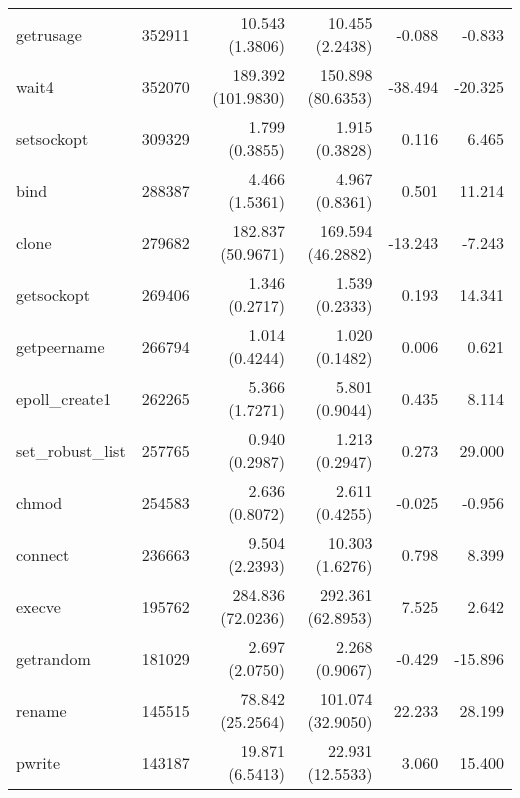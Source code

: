 \begin{longtable}{>{\ttfamily}lrrrrr}
                      getrusage &      352911 &          10.543 (1.3806) &          10.455 (2.2438) &          -0.088 &       -0.833 \\
                          wait4 &      352070 &       189.392 (101.9830) &        150.898 (80.6353) &         -38.494 &      -20.325 \\
                     setsockopt &      309329 &           1.799 (0.3855) &           1.915 (0.3828) &           0.116 &        6.465 \\
                           bind &      288387 &           4.466 (1.5361) &           4.967 (0.8361) &           0.501 &       11.214 \\
                          clone &      279682 &        182.837 (50.9671) &        169.594 (46.2882) &         -13.243 &       -7.243 \\
                     getsockopt &      269406 &           1.346 (0.2717) &           1.539 (0.2333) &           0.193 &       14.341 \\
                    getpeername &      266794 &           1.014 (0.4244) &           1.020 (0.1482) &           0.006 &        0.621 \\
                 epoll\_create1 &      262265 &           5.366 (1.7271) &           5.801 (0.9044) &           0.435 &        8.114 \\
              set\_robust\_list &      257765 &           0.940 (0.2987) &           1.213 (0.2947) &           0.273 &       29.000 \\
                          chmod &      254583 &           2.636 (0.8072) &           2.611 (0.4255) &          -0.025 &       -0.956 \\
                        connect &      236663 &           9.504 (2.2393) &          10.303 (1.6276) &           0.798 &        8.399 \\
                         execve &      195762 &        284.836 (72.0236) &        292.361 (62.8953) &           7.525 &        2.642 \\
                      getrandom &      181029 &           2.697 (2.0750) &           2.268 (0.9067) &          -0.429 &      -15.896 \\
                         rename &      145515 &         78.842 (25.2564) &        101.074 (32.9050) &          22.233 &       28.199 \\
                         pwrite &      143187 &          19.871 (6.5413) &         22.931 (12.5533) &           3.060 &       15.400 \\

\end{longtable}
